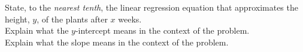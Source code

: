 \documentclass[12pt, twoside]{article}
\begin{document}
\begin{enumerate}
\begin{center} %
\end{center}
State, to the \emph{nearest tenth}, the linear regression equation that approximates the height, $y$, of the plants after $x$ weeks.\\[2cm]
Explain what the $y$-intercept means in the context of the problem. \\[3cm]
Explain what the slope means in the context of the problem.


\end{enumerate}
\end{document}
